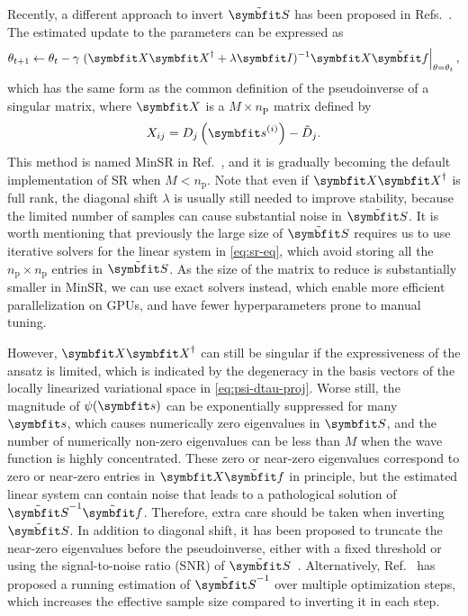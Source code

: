 Recently, a different approach to invert $\tilde{\mS}$ has been proposed in Refs.~\cite{chen2023efficient, rende2024simple}. The estimated update to the parameters can be expressed as
\begin{equation}
\theta_{t + 1} \gets \theta_t - \gamma \left. (\mX \mX^\dagger + \lambda \mI)^{-1} \mX \tilde{\vf} \right|_{\theta = \theta_t},
\label{eq:minsr}
\end{equation}
which has the same form as the common definition of the pseudoinverse of a singular matrix, where $\mX$ is a $M \times n_\text{P}$ matrix defined by
\begin{equation}
X_{i j} = D_j\left( \vs^{(i)} \right) - \tilde{D}_j.
\end{equation}
This method is named MinSR in Ref.~\cite{chen2023efficient}, and it is gradually becoming the default implementation of SR when $M < n_\text{p}$. Note that even if $\mX \mX^\dagger$ is full rank, the diagonal shift $\lambda$ is usually still needed to improve stability, because the limited number of samples can cause substantial noise in $\tilde{\mS}$. It is worth mentioning that previously the large size of $\tilde{\mS}$ requires us to use iterative solvers for the linear system in \cref{eq:sr-eq}, which avoid storing all the $n_\text{p} \times n_\text{p}$ entries in $\tilde{\mS}$. As the size of the matrix to reduce is substantially smaller in MinSR, we can use exact solvers instead, which enable more efficient parallelization on GPUs, and have fewer hyperparameters prone to manual tuning.

However, $\mX \mX^\dagger$ can still be singular if the expressiveness of the ansatz is limited, which is indicated by the degeneracy in the basis vectors of the locally linearized variational space in \cref{eq:psi-dtau-proj}. Worse still, the magnitude of $\psi(\vs)$ can be exponentially suppressed for many $\vs$, which causes numerically zero eigenvalues in $\mS$, and the number of numerically non-zero eigenvalues can be less than $M$ when the wave function is highly concentrated. These zero or near-zero eigenvalues correspond to zero or near-zero entries in $\mX \tilde{\vf}$ in principle, but the estimated linear system can contain noise that leads to a pathological solution of $\tilde{\mS}^{-1} \tilde{\vf}$. Therefore, extra care should be taken when inverting $\tilde{\mS}$. In addition to diagonal shift, it has been proposed to truncate the near-zero eigenvalues before the pseudoinverse, either with a fixed threshold or using the signal-to-noise ratio (SNR) of $\tilde{\mS}$~\cite{schmitt2020quantum, chen2023efficient}. Alternatively, Ref.~\cite{goldshlager2024kaczmarz} has proposed a running estimation of $\tilde{\mS}^{-1}$ over multiple optimization steps, which increases the effective sample size compared to inverting it in each step.

